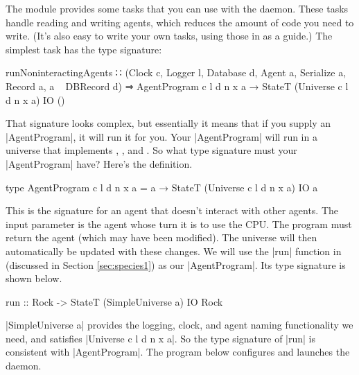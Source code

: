 
The module  provides some tasks
that you can use with the daemon.
These tasks handle reading and writing agents,
which reduces the amount of code you need to write.
(It's also easy to write your own tasks, using those in 
 as a guide.)
The simplest task has the type signature:

\begin{code}
runNoninteractingAgents ∷ (Clock c, Logger l, Database d, Agent a, 
    Serialize a, Record a, a ~ DBRecord d) ⇒
  AgentProgram c l d n x a → StateT (Universe c l d n x a) IO ()
\end{code}

That signature looks complex, but essentially it means that if you
supply an |AgentProgram|, it will run it for you.
Your |AgentProgram| will run in a universe that implements
,
, and
.
So what type signature must your |AgentProgram| have?
Here's the definition.

\begin{code}
type AgentProgram c l d n x a = a → StateT (Universe c l d n x a) IO a
\end{code}

This is the signature for an agent that doesn't interact with other
agents.
The input parameter is the agent whose turn it is to use the CPU.
The program must return the agent (which may have been modified).
The universe will then automatically be updated with these changes.
We will use the |run| function in 
(discussed in Section \ref{sec:species1}) as our |AgentProgram|.
Its type signature is shown below.

\begin{code}
run :: Rock -> StateT (SimpleUniverse a) IO Rock
\end{code}

|SimpleUniverse a| provides the logging, clock, and agent naming
functionality we need, and satisfies |Universe c l d n x a|.
So the type signature of |run| is consistent with |AgentProgram|.
The program below configures and launches the daemon.


